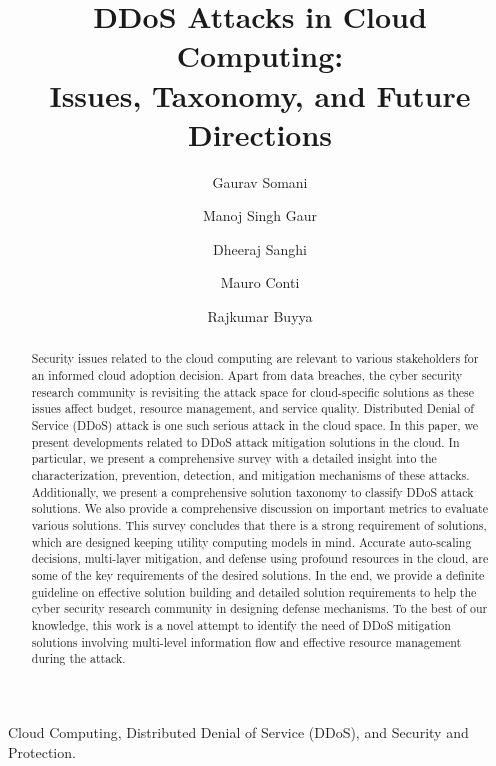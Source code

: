 \documentclass[final,5p,times,twocolumn]{elsarticle}
\begin{document}
\begin{frontmatter}


\title{DDoS Attacks in Cloud Computing:\\ Issues, Taxonomy, and Future Directions}


\author[GS,MSG]{Gaurav Somani}
\author[MSG]{Manoj Singh Gaur}
\author[DS]{Dheeraj Sanghi} 
\author[MC]{Mauro Conti}
\author[RB]{Rajkumar Buyya}

\address[GS]{Central University of Rajasthan, Ajmer, India}
\address[MSG]{Malaviya National Institute of Technology, Jaipur, India}
\address[DS]{Indian Institute of Technology, Kanpur, India}
\address[MC]{University of Padua, Padua, Italy}
\address[RB]{The University of Melbourne, Melbourne, Australia}

\begin{abstract}
{Security issues related to the cloud computing are relevant to various stakeholders for an informed cloud adoption decision. Apart from data breaches, the cyber security research community is revisiting the attack space for cloud-specific solutions as these issues affect budget, resource management, and service quality. Distributed Denial of Service (DDoS) attack is one such serious attack in the cloud space. In this paper, we present developments related to DDoS attack mitigation solutions in the cloud. In particular, we present a comprehensive survey with a detailed insight into the characterization, prevention, detection, and mitigation mechanisms of these attacks. Additionally, we present a comprehensive solution taxonomy to classify DDoS attack solutions. We also provide a comprehensive discussion on important metrics to evaluate various solutions. This survey concludes that there is a strong requirement of solutions, which are designed keeping utility computing models in mind. Accurate auto-scaling decisions, multi-layer mitigation, and defense using profound resources in the cloud, are some of the key requirements of the desired solutions. In the end, we provide a definite guideline on effective solution building and detailed solution requirements to help the cyber security research community in designing defense mechanisms. To the best of our knowledge, this work is a novel attempt to identify the need of DDoS mitigation solutions involving multi-level information flow and effective resource management during the attack. }
\end{abstract}

\begin{keyword}
Cloud Computing, Distributed Denial of Service (DDoS), and Security and Protection.
\end{keyword}


\end{frontmatter}
\end{document}
